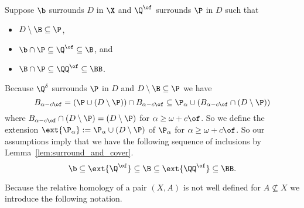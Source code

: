 \clearpage

Suppose $\b$ surrounds $D$ in $\X$ and $\Q^\of$ surrounds $\P$ in $D$ such that
\begin{itemize}
  \item $D\setminus \B\subseteq \P$,
  \item $\b\cap \P \subseteq \Q^\of\subseteq \B$, and
  \item $\B\cap \P\subseteq \QQ^\of\subseteq \BB$.
\end{itemize}

Because $\Q^\delta$ surrounds $\P$ in $D$ and $D\setminus \B\subseteq \P$ we have
\[ B_{\alpha-c\of} = (\P\cup (D\setminus \P))\cap B_{\alpha -c\of}\subseteq \P_\alpha \cup (B_{\alpha - c\of}\cap (D\setminus \P))\]
where $B_{\alpha - c\of}\cap (D\setminus \P) = (D\setminus \P)$ for $\alpha\geq \omega+c\of$.
So we define the extension $\ext{\P_\alpha} := \P_\alpha\cup (D\setminus \P)$ of $\P_\alpha$ for $\alpha\geq\omega+c\of$.
So our assumptions imply that we have the following sequence of inclusions by Lemma~\ref{lem:surround_and_cover}.
\[ \b\subseteq \ext{\Q^\of}\subseteq \B\subseteq\ext{\QQ^\of}\subseteq \BB.\]

Because the relative homology of a pair $(X, A)$ is not well defined for $A\not\subseteq X$ we introduce the following notation.


